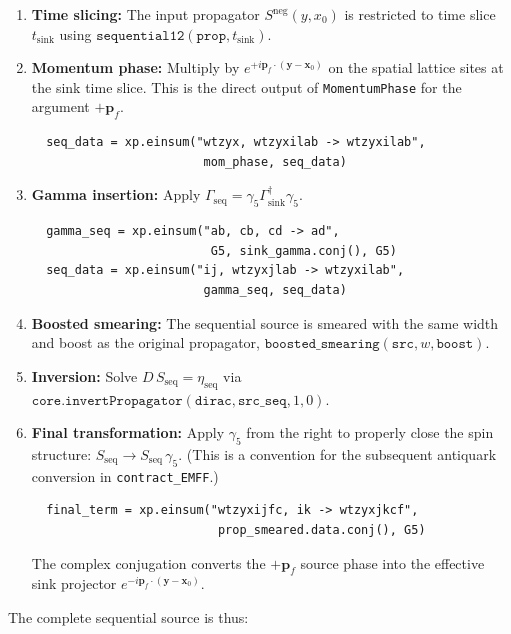\documentclass[11pt,a4paper]{article}
\newcommand{\gfive}{\gamma_5}
\newcommand{\gsink}{\Gamma_{\text{sink}}}
\newcommand{\gseq}{\Gamma_{\text{seq}}}
\newcommand{\Sseq}{S_{\text{seq}}}
\newcommand{\etaseq}{\eta_{\text{seq}}}
\begin{document}
\begin{enumerate}[nosep]
  \item \textbf{Time slicing:} The input propagator \(S^{\text{neg}}(y, x_0)\)
        is restricted to time slice \(t_{\text{sink}}\) using
        \(\texttt{sequential12}(\texttt{prop}, t_{\text{sink}})\).
  \item \textbf{Momentum phase:} Multiply by
        \(e^{+i\mathbf{p}_f\cdot(\mathbf{y}-\mathbf{x}_0)}\) on the
        spatial lattice sites at the sink time slice.  This is the direct
        output of \texttt{MomentumPhase} for the argument \(+\mathbf p_f\).
        \begin{verbatim}
  seq_data = xp.einsum("wtzyx, wtzyxilab -> wtzyxilab",
                        mom_phase, seq_data)
        \end{verbatim}
  \item \textbf{Gamma insertion:} Apply \(\gseq = \gfive \gsink^\dagger \gfive\).
        \begin{verbatim}
  gamma_seq = xp.einsum("ab, cb, cd -> ad",
                         G5, sink_gamma.conj(), G5)
  seq_data = xp.einsum("ij, wtzyxjlab -> wtzyxilab",
                        gamma_seq, seq_data)
        \end{verbatim}
  \item \textbf{Boosted smearing:} The sequential source is smeared with the
        same width and boost as the original propagator,
        \(\texttt{boosted\_smearing}(\texttt{src}, w, \texttt{boost})\).
  \item \textbf{Inversion:} Solve \(D \, \Sseq = \etaseq\) via
        \(\texttt{core.invertPropagator}(\texttt{dirac}, \texttt{src\_seq}, 1, 0)\).
  \item \textbf{Final transformation:} Apply \(\gfive\) from the right to
        properly close the spin structure:
        \(\Sseq \to \Sseq \, \gfive\).  (This is a convention for the subsequent
        antiquark conversion in \texttt{contract\_EMFF}.)
        \begin{verbatim}
  final_term = xp.einsum("wtzyxijfc, ik -> wtzyxjkcf",
                          prop_smeared.data.conj(), G5)
        \end{verbatim}
        The complex conjugation converts the \(+\mathbf p_f\) source phase
        into the effective sink projector
        \(e^{-i\mathbf p_f\cdot(\mathbf y-\mathbf x_0)}\).
\end{enumerate}

The complete sequential source is thus:
\end{document}
